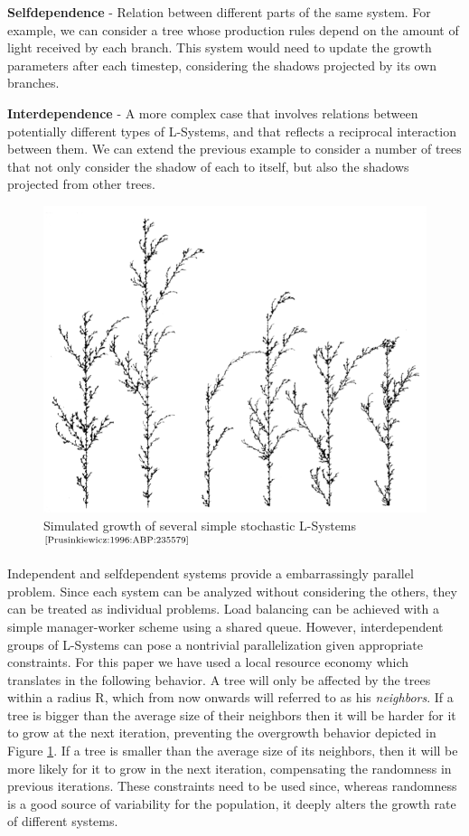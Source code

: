 \documentclass[letterpaper,twoside,11pt]{article}
\begin{document}
\begin{multicols}{2}
\begin{compactenum}[a)]
\item \textbf{Selfdependence} - Relation between different parts of the same system. For example, we can consider a tree whose production rules depend on the amount of light received by each branch. This system would need to update the growth parameters after each timestep, considering the shadows projected by its own branches.
\item \textbf{Interdependence} - A more complex case that involves relations between potentially different types of L-Systems, and that reflects a reciprocal interaction between them. We can extend the previous example to consider a number of trees that not only consider the shadow of each to itself, but also the shadows projected from other trees.
\end{compactenum}
\begin{figure}[H]
  \centering
    \includegraphics[width=.45\textwidth]{stochastic.png}
    \caption{Simulated growth of several simple stochastic L-Systems$^{\text{\cite{Prusinkiewicz:1996:ABP:235579}}}$}
    \label{fig:stochas}
\end{figure}
 Independent and selfdependent systems provide a embarrassingly parallel problem. Since each system can be analyzed without considering the others, they can be treated as individual problems. Load balancing can be achieved with a simple manager-worker scheme using a shared queue. However, interdependent groups of L-Systems can pose a nontrivial parallelization given appropriate constraints. For this paper we have used a local resource economy which translates in the following behavior. A tree will only be affected by the trees within a radius R, which from now onwards will referred to as his \emph{neighbors}. If a tree is bigger than the average size of their neighbors then it will be harder for it to grow at the next iteration, preventing the overgrowth behavior depicted in Figure \ref{fig:stochas}. If a tree is smaller than the average size of its neighbors, then it will be more likely for it to grow in the next iteration, compensating the randomness in previous iterations. These constraints need to be used since, whereas randomness is a good source of variability for the population, it deeply alters the growth rate of different systems.


\end{multicols}
\end{document}
